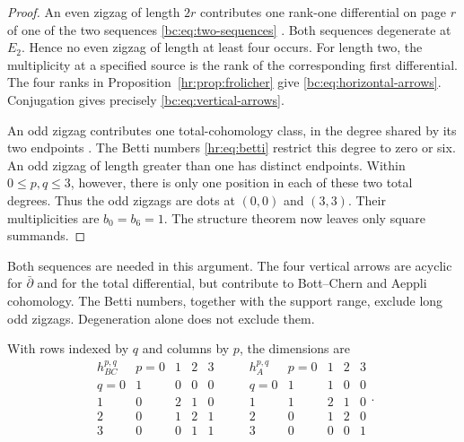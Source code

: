 \begin{proof}
An even zigzag of length $2r$ contributes one rank-one
differential on page $r$ of one of the two sequences
\eqref{bc:eq:two-sequences}
\cite[Proposition~6 and Corollary~7]{StelzigDouble}.
Both sequences degenerate at $E_2$. Hence no even zigzag of
length at least four occurs.
For length two, the multiplicity at a specified source is the
rank of the corresponding first differential.
The four ranks in Proposition~\ref{hr:prop:frolicher} give
\eqref{bc:eq:horizontal-arrows}. Conjugation gives precisely
\eqref{bc:eq:vertical-arrows}.

An odd zigzag contributes one total-cohomology class, in the
degree shared by its two endpoints
\cite[Proposition~6]{StelzigDouble}.
The Betti numbers \eqref{hr:eq:betti} restrict this degree to
zero or six. An odd zigzag of length greater than one has
distinct endpoints. Within $0\le p,q\le3$, however, there is
only one position in each of these two total degrees.
Thus the odd zigzags are dots at $(0,0)$ and $(3,3)$.
Their multiplicities are $b_0=b_6=1$.
The structure theorem now leaves only square summands.
\end{proof}

Both sequences are needed in this argument. The four vertical
arrows are acyclic for $\bar\partial$ and for the total
differential, but contribute to Bott--Chern and Aeppli cohomology.
The Betti numbers, together with the support range, exclude
long odd zigzags. Degeneration alone does not exclude them.

\begin{corollary}\label{bc:cor:tables}
With rows indexed by $q$ and columns by $p$, the dimensions are
\begin{equation}\label{bc:eq:tables}
 \begin{array}{c|rrrr}
 h_{BC}^{p,q}&p=0&1&2&3\\ \hline
 q=0&1&0&0&0\\
 1&0&2&1&0\\
 2&0&1&2&1\\
 3&0&0&1&1
 \end{array}
 \qquad
 \begin{array}{c|rrrr}
 h_A^{p,q}&p=0&1&2&3\\ \hline
 q=0&1&1&0&0\\
 1&1&2&1&0\\
 2&0&1&2&0\\
 3&0&0&0&1
 \end{array}.
\end{equation}
\end{corollary}

